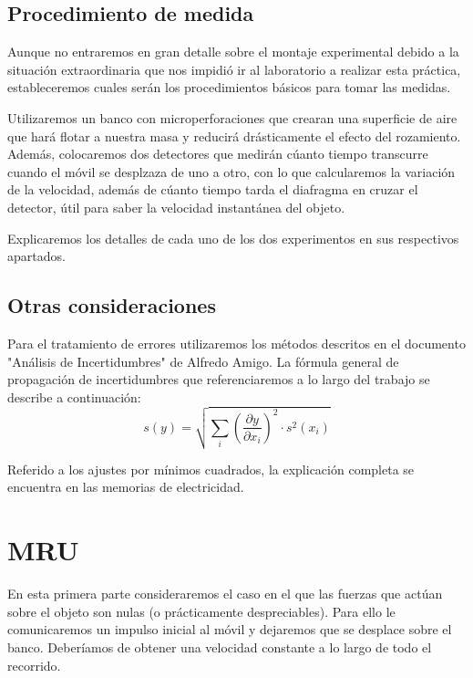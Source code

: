 \documentclass[12pt, a4paper, titlepage]{article}
\begin{document}
  \subsection{Procedimiento de medida}

  Aunque no entraremos en gran detalle sobre el montaje experimental debido a la situación extraordinaria que nos impidió ir al laboratorio a realizar esta práctica, estableceremos cuales serán los procedimientos básicos para tomar las medidas.

  Utilizaremos un banco con microperforaciones que crearan una superficie de aire que hará flotar a nuestra masa y reducirá drásticamente el efecto del rozamiento. Además, colocaremos dos detectores que medirán cúanto tiempo transcurre cuando el móvil se desplzaza de uno a otro, con lo que calcularemos la variación de la velocidad, además de cúanto tiempo tarda el diafragma en cruzar el detector, útil para saber la velocidad instantánea del objeto.

  Explicaremos los detalles de cada uno de los dos experimentos en sus respectivos apartados.

  \subsection{Otras consideraciones}

  Para el tratamiento de errores utilizaremos los métodos descritos en el documento "Análisis de Incertidumbres" de Alfredo Amigo. La fórmula general de propagación de incertidumbres que referenciaremos a lo largo del trabajo se describe a continuación:
  \begin{equation}
    s(y) = \sqrt{\sum_i{\left( \frac{\partial y}{\partial x_i} \right)^2 \cdot s^2(x_i)}} \label{ec:sy}
  \end{equation}

  Referido a los ajustes por mínimos cuadrados, la explicación completa se encuentra en las memorias de electricidad.

  \newpage
  \section{MRU}

  En esta primera parte consideraremos el caso en el que las fuerzas que actúan sobre el objeto son nulas (o prácticamente despreciables). Para ello le comunicaremos un impulso inicial al móvil y dejaremos que se desplace sobre el banco. Deberíamos de obtener una velocidad constante a lo largo de todo el recorrido.
\end{document}
